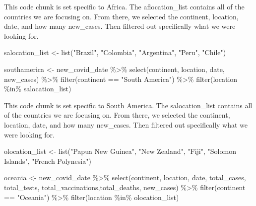 \documentclass[
]{article}
\newenvironment{Shaded}{\begin{snugshade}}{\end{snugshade}}
\newcommand{\FunctionTok}[1]{\textcolor[rgb]{0.00,0.00,0.00}{#1}}
\newcommand{\NormalTok}[1]{#1}
\newcommand{\OtherTok}[1]{\textcolor[rgb]{0.56,0.35,0.01}{#1}}
\newcommand{\SpecialCharTok}[1]{\textcolor[rgb]{0.00,0.00,0.00}{#1}}
\newcommand{\StringTok}[1]{\textcolor[rgb]{0.31,0.60,0.02}{#1}}
\begin{document}
This code chunk is set specific to Africa. The aflocation\_list contains
all of the countries we are focusing on. From there, we selected the
continent, location, date, and how many new\_cases. Then filtered out
specifically what we were looking for.

\begin{Shaded}
\begin{Highlighting}[]
\NormalTok{salocation\_list }\OtherTok{\textless{}{-}} \FunctionTok{list}\NormalTok{(}\StringTok{"Brazil"}\NormalTok{, }\StringTok{"Colombia"}\NormalTok{, }\StringTok{"Argentina"}\NormalTok{, }\StringTok{"Peru"}\NormalTok{, }\StringTok{"Chile"}\NormalTok{)}

\NormalTok{southamerica }\OtherTok{\textless{}{-}}\NormalTok{ new\_covid\_date }\SpecialCharTok{\%\textgreater{}\%} 
  \FunctionTok{select}\NormalTok{(continent, location, date, new\_cases) }\SpecialCharTok{\%\textgreater{}\%} 
  \FunctionTok{filter}\NormalTok{(continent }\SpecialCharTok{==} \StringTok{"South America"}\NormalTok{) }\SpecialCharTok{\%\textgreater{}\%} 
  \FunctionTok{filter}\NormalTok{(location }\SpecialCharTok{\%in\%}\NormalTok{ salocation\_list)}
\end{Highlighting}
\end{Shaded}

This code chunk is set specific to South America. The salocation\_list
contains all of the countries we are focusing on. From there, we
selected the continent, location, date, and how many new\_cases. Then
filtered out specifically what we were looking for.

\begin{Shaded}
\begin{Highlighting}[]
\NormalTok{olocation\_list }\OtherTok{\textless{}{-}} \FunctionTok{list}\NormalTok{(}\StringTok{"Papua New Guinea"}\NormalTok{, }\StringTok{"New Zealand"}\NormalTok{, }\StringTok{"Fiji"}\NormalTok{, }\StringTok{"Solomon Islands"}\NormalTok{, }\StringTok{"French Polynesia"}\NormalTok{)}

\NormalTok{oceania }\OtherTok{\textless{}{-}}\NormalTok{ new\_covid\_date }\SpecialCharTok{\%\textgreater{}\%} 
  \FunctionTok{select}\NormalTok{(continent, location, date, total\_cases, total\_tests, total\_vaccinations,total\_deaths, new\_cases) }\SpecialCharTok{\%\textgreater{}\%} 
  \FunctionTok{filter}\NormalTok{(continent }\SpecialCharTok{==} \StringTok{"Oceania"}\NormalTok{) }\SpecialCharTok{\%\textgreater{}\%} 
  \FunctionTok{filter}\NormalTok{(location }\SpecialCharTok{\%in\%}\NormalTok{ olocation\_list)}
\end{Highlighting}
\end{Shaded}
\end{document}
